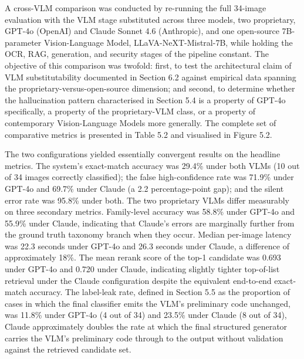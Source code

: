 A cross-VLM comparison was conducted by re-running the full 34-image evaluation with the VLM stage substituted across three models, two proprietary, GPT-4o (OpenAI) and Claude Sonnet 4.6 (Anthropic), and one open-source 7B-parameter Vision-Language Model, LLaVA-NeXT-Mistral-7B, while holding the OCR, RAG, generation, and security stages of the pipeline constant. The objective of this comparison was twofold: first, to test the architectural claim of VLM substitutability documented in Section 6.2 against empirical data spanning the proprietary-versus-open-source dimension; and second, to determine whether the hallucination pattern characterised in Section 5.4 is a property of GPT-4o specifically, a property of the proprietary-VLM class, or a property of contemporary Vision-Language Models more generally. The complete set of comparative metrics is presented in Table 5.2 and visualised in Figure 5.2.

The two configurations yielded essentially convergent results on the headline metrics. The system's exact-match accuracy was 29.4\% under both VLMs (10 out of 34 images correctly classified); the false high-confidence rate was 71.9\% under GPT-4o and 69.7\% under Claude (a 2.2 percentage-point gap); and the silent error rate was 95.8\% under both. The two proprietary VLMs differ measurably on three secondary metrics. Family-level accuracy was 58.8\% under GPT-4o and 55.9\% under Claude, indicating that Claude's errors are marginally further from the ground truth taxonomy branch when they occur. Median per-image latency was 22.3 seconds under GPT-4o and 26.3 seconds under Claude, a difference of approximately 18\%. The mean rerank score of the top-1 candidate was 0.693 under GPT-4o and 0.720 under Claude, indicating slightly tighter top-of-list retrieval under the Claude configuration despite the equivalent end-to-end exact-match accuracy. The label-leak rate, defined in Section 5.5 as the proportion of cases in which the final classifier emits the VLM's preliminary code unchanged, was 11.8\% under GPT-4o (4 out of 34) and 23.5\% under Claude (8 out of 34), Claude approximately doubles the rate at which the final structured generator carries the VLM's preliminary code through to the output without validation against the retrieved candidate set.

